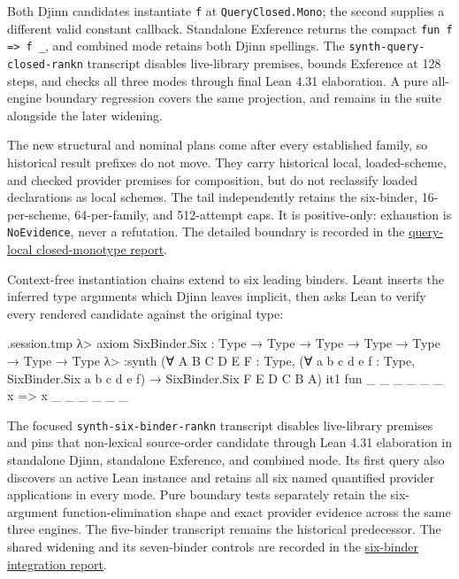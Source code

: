 \documentclass[11pt,oneside]{article}
\newcommand{\code}[1]{\texttt{#1}}
\newenvironment{session}
 {\VerbatimEnvironment\begin{VerbatimOut}{\jobname.session.tmp}}
 {\end{VerbatimOut}%
  \begin{sessionouter}%
  \VerbatimInput[fontsize=\footnotesize, breaklines=true,
    breaksymbolleft={\textcolor{stone}{\footnotesize$\hookrightarrow$}},
    formatcom=\color{ink}, tabsize=4]{\jobname.session.tmp}%
  \end{sessionouter}}
\begin{document}
Both Djinn candidates instantiate \code{f} at
\code{QueryClosed.Mono}; the second supplies a different valid constant
callback. Standalone Exference returns the compact
\code{fun f => f \_}, and combined mode retains both Djinn spellings.
The \code{synth-query-closed-rankn} transcript disables live-library premises,
bounds Exference at 128 steps, and checks all three modes through final Lean
4.31 elaboration. A pure all-engine boundary regression covers the same
projection, and remains in the suite alongside the later widening.

The new structural and nominal plans come after every established family, so
historical result prefixes do not move. They carry historical local,
loaded-scheme, and checked provider premises for composition, but do not
reclassify loaded declarations as local schemes. The tail independently
retains the six-binder, 16-per-scheme, 64-per-family, and 512-attempt caps.
It is positive-only: exhaustion is \code{NoEvidence}, never a refutation. The
detailed boundary is recorded in the
\href{reports/2026-08-09-query-local-closed-monotype-instantiation.md}{query-local
closed-monotype report}.

Context-free instantiation chains extend to six leading binders. Leant
inserts the inferred type arguments which Djinn leaves implicit, then asks
Lean to verify every rendered candidate against the original type:

\begin{session}
λ> axiom SixBinder.Six : Type → Type → Type → Type → Type → Type → Type
λ> :synth (∀ A B C D E F : Type, (∀ a b c d e f : Type, SixBinder.Six a b c d e f) → SixBinder.Six F E D C B A)
  it1  fun _ _ _ _ _ _ x => x _ _ _ _ _ _
\end{session}

The focused \code{synth-six-binder-rankn} transcript disables live-library
premises and pins that non-lexical source-order candidate through Lean 4.31
elaboration in standalone Djinn, standalone Exference, and combined mode. Its
first query also discovers an active Lean instance and retains all six named
quantified provider applications in every mode. Pure boundary tests separately
retain the six-argument function-elimination shape and exact provider evidence
across the same three engines. The five-binder transcript remains the
historical predecessor. The shared widening and its seven-binder controls are
recorded in the
\href{reports/2026-08-10-six-binder-instantiation.md}{six-binder integration
report}.
\end{document}
